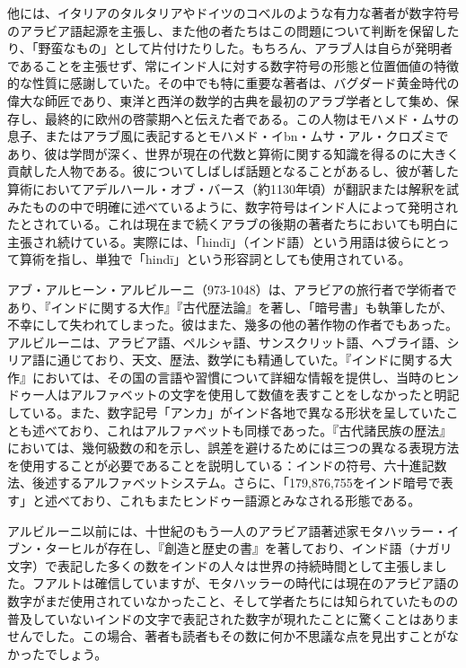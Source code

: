 \documentclass[a4paper,11pt,openany]{ltjsbook}
\begin{document}
他には、イタリアのタルタリアやドイツのコベルのような有力な著者が数字符号のアラビア語起源を主張し、また他の者たちはこの問題について判断を保留したり、「野蛮なもの」として片付けたりした。もちろん、アラブ人は自らが発明者であることを主張せず、常にインド人に対する数字符号の形態と位置価値の特徴的な性質に感謝していた。その中でも特に重要な著者は、バグダード黄金時代の偉大な師匠であり、東洋と西洋の数学的古典を最初のアラブ学者として集め、保存し、最終的に欧州の啓蒙期へと伝えた者である。この人物はモハメド・ムサの息子、またはアラブ風に表記するとモハメド・イbn・ムサ・アル・クロズミであり、彼は学問が深く、世界が現在の代数と算術に関する知識を得るのに大きく貢献した人物である。彼についてしばしば話題となることがあるし、彼が著した算術においてアデルハール・オブ・バース（約1130年頃）が翻訳または解釈を試みたものの中で明確に述べているように、数字符号はインド人によって発明されたとされている。これは現在まで続くアラブの後期の著者たちにおいても明白に主張され続けている。実際には、「hindī」（インド語）という用語は彼らにとって算術を指し、単独で「hindī」という形容詞としても使用されている。

アブ・アルヒーン・アルビルーニ（973-1048）は、アラビアの旅行者で学術者であり、『インドに関する大作』『古代歴法論』を著し、「暗号書」も執筆したが、不幸にして失われてしまった。彼はまた、幾多の他の著作物の作者でもあった。アルビルーニは、アラビア語、ペルシャ語、サンスクリット語、ヘブライ語、シリア語に通じており、天文、歴法、数学にも精通していた。『インドに関する大作』においては、その国の言語や習慣について詳細な情報を提供し、当時のヒンドゥー人はアルファベットの文字を使用して数値を表すことをしなかったと明記している。また、数字記号「アンカ」がインド各地で異なる形状を呈していたことも述べており、これはアルファベットも同様であった。『古代諸民族の歴法』においては、幾何級数の和を示し、誤差を避けるためには三つの異なる表現方法を使用することが必要であることを説明している：インドの符号、六十進記数法、後述するアルファベットシステム。さらに、「179,876,755をインド暗号で表す」と述べており、これもまたヒンドゥー語源とみなされる形態である。

アルビルーニ以前には、十世紀のもう一人のアラビア語著述家モタハッラー・イブン・ターヒルが存在し、『創造と歴史の書』を著しており、インド語（ナガリ文字）で表記した多くの数をインドの人々は世界の持続時間として主張しました。フアルトは確信していますが、モタハッラーの時代には現在のアラビア語の数字がまだ使用されていなかったこと、そして学者たちには知られていたものの普及していないインドの文字で表記された数字が現れたことに驚くことはありませんでした。この場合、著者も読者もその数に何か不思議な点を見出すことがなかったでしょう。
\end{document}
